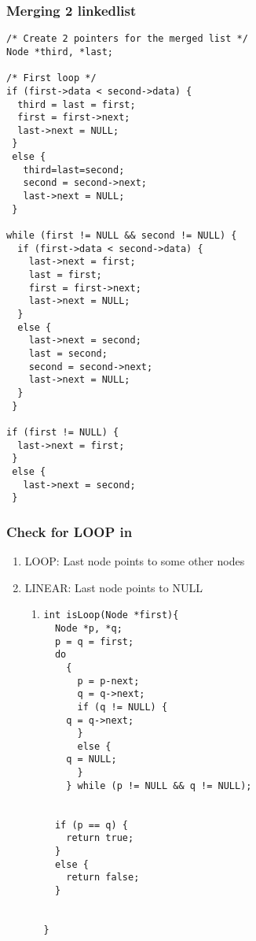 \documentclass[11pt]{article}
\begin{document}
\subsubsection{Merging 2 linkedlist}
\label{sec:orgce1c559}
\begin{verbatim}
/* Create 2 pointers for the merged list */
Node *third, *last;

/* First loop */
if (first->data < second->data) {
  third = last = first;
  first = first->next;
  last->next = NULL;
 }
 else {
   third=last=second;
   second = second->next;
   last->next = NULL;
 }

while (first != NULL && second != NULL) {
  if (first->data < second->data) {
    last->next = first;
    last = first;
    first = first->next;
    last->next = NULL;
  }
  else {
    last->next = second;
    last = second;
    second = second->next;
    last->next = NULL;
  }
 }

if (first != NULL) {
  last->next = first;
 }
 else {
   last->next = second;
 }
\end{verbatim}
\subsubsection{Check for LOOP in}
\label{sec:orgf0ea99b}
\begin{enumerate}
\item LOOP: Last node points to some other nodes
\label{sec:orgb11365e}
\item LINEAR: Last node points to NULL
\label{sec:orgbc3f19d}
\begin{enumerate}
\item 
\label{sec:org2c7f655}
\begin{verbatim}
int isLoop(Node *first){
  Node *p, *q;
  p = q = first;
  do
    {
      p = p-next;
      q = q->next;
      if (q != NULL) {
	q = q->next;
      }
      else {
	q = NULL;
      }
    } while (p != NULL && q != NULL);


  if (p == q) {
    return true;
  }
  else {
    return false;
  }


}
\end{verbatim}
\end{enumerate}
\end{enumerate}
\end{document}
